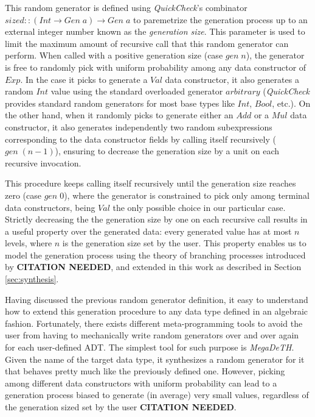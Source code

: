 \documentclass[conference]{IEEEtran}
\newcommand{\Conid}[1]{\mathit{#1}}
\newcommand{\Varid}[1]{\mathit{#1}}
\newcommand{\tocite}{\textbf{CITATION NEEDED}}
\newcommand{\quickcheck}{\emph{QuickCheck}\xspace}
\newcommand{\megadeth}{\emph{MegaDeTH}\xspace}
\begin{document}
This random generator is defined using \quickcheck's combinator \ensuremath{\Varid{sized}\mathbin{::}(\Conid{Int}\to \Conid{Gen}\;\Varid{a})\to \Conid{Gen}\;\Varid{a}} to paremetrize the generation process up to an external
integer number known as the \emph{generation size}.
%
This parameter is used to limit the maximum amount of recursive call that this
random generator can perform.
%
When called with a positive generation size (case \ensuremath{\Varid{gen}\;\Varid{n}}), the generator is free
to randomly pick with uniform probability among any data constructor of \ensuremath{\Conid{Exp}}.
%
In the case it picks to generate a \ensuremath{\Conid{Val}} data constructor, it also generates a
random \ensuremath{\Conid{Int}} value using the standard overloaded generator \ensuremath{\Varid{arbitrary}}
(\quickcheck provides standard random generators for most base types like \ensuremath{\Conid{Int}},
\ensuremath{\Conid{Bool}}, etc.).
%
On the other hand, when it randomly picks to generate either an \ensuremath{\Conid{Add}} or a \ensuremath{\Conid{Mul}}
data constructor, it also generates independently two random subexpressions
corresponding to the data constructor fields by calling itself recursively (\ensuremath{\Varid{gen}\;(n{-}1)}), ensuring to decrease the generation size by a unit on each recursive
invocation.


This procedure keeps calling itself recursively until the generation size
reaches zero (case \ensuremath{\Varid{gen}\;\mathrm{0}}), where the generator is constrained to pick only
among terminal data constructors, being \ensuremath{\Conid{Val}} the only possible choice in our
particular case.
%
Strictly decreasing the the generation size by one on each recursive call
results in a useful property over the generated data: every generated value has
at most \ensuremath{\Varid{n}} levels, where \ensuremath{\Varid{n}} is the generation size set by the user.
%
This property enables us to model the generation process using the theory of
branching processes introduced by \tocite, and extended in this work as
described in Section \ref{sec:synthesis}.


Having discussed the previous random generator definition, it easy to understand
how to extend this generation procedure to any data type defined in an algebraic
fashion.
%
Fortunately, there exists different meta-programming tools to avoid the user
from having to mechanically write random generators over and over again for each
user-defined ADT.
%
The simplest tool for such purpose is \megadeth.
%
Given the name of the target data type, it synthesizes a random generator for it
that behaves pretty much like the previously defined one.
%
However, picking among different data constructors with uniform probability can
lead to a generation process biased to generate (in average) very small values,
regardless of the generation sized set by the user \tocite.
\end{document}
